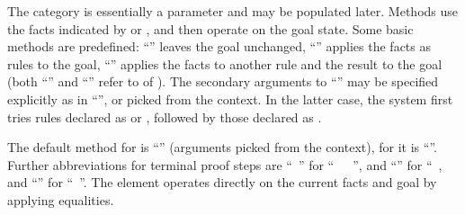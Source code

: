 \begin{isabellebody}
\begin{isamarkuptext}
  The  category is essentially a parameter and may be
  populated later.  Methods use the facts indicated by \hyperlink{command.then}{\mbox{}} or \hyperlink{command.using}{\mbox{}}, and then operate on the goal state.
  Some basic methods are predefined: ``\hyperlink{method.-}{\mbox{\isa{{\isacharminus}}}}'' leaves the goal
  unchanged, ``\hyperlink{method.this}{\mbox{}}'' applies the facts as rules to the
  goal, ``\hyperlink{method.rule}{\mbox{}}'' applies the facts to another rule and the
  result to the goal (both ``\hyperlink{method.this}{\mbox{}}'' and ``\hyperlink{method.rule}{\mbox{}}''
  refer to \hyperlink{inference.resolution}{\mbox{}} of
  ).  The secondary arguments to
  ``\hyperlink{method.rule}{\mbox{}}'' may be specified explicitly as in ``'', or picked from the context.  In the latter case, the system
  first tries rules declared as \hyperlink{attribute.Pure.elim}{\mbox{}} or
  \hyperlink{attribute.Pure.dest}{\mbox{}}, followed by those declared as \hyperlink{attribute.Pure.intro}{\mbox{}}.

  The default method for \hyperlink{command.proof}{\mbox{}} is ``\hyperlink{method.rule}{\mbox{}}''
  (arguments picked from the context), for \hyperlink{command.qed}{\mbox{}} it is
  ``\hyperlink{method.-}{\mbox{\isa{{\isacharminus}}}}''.  Further abbreviations for terminal proof steps
  are ``\hyperlink{command.by}{\mbox{}}~'' for
  ``\hyperlink{command.proof}{\mbox{}}~~\hyperlink{command.qed}{\mbox{}}~'', and ``\hyperlink{command.ddot}{\mbox{\isa{\isacommand{{\isachardot}{\isachardot}}}}}'' for ``\hyperlink{command.by}{\mbox{}}~\hyperlink{method.rule}{\mbox{}}, and ``\hyperlink{command.dot}{\mbox{\isa{\isacommand{{\isachardot}}}}}'' for ``\hyperlink{command.by}{\mbox{}}~\hyperlink{method.this}{\mbox{}}''.  The \hyperlink{command.unfolding}{\mbox{}} element operates
  directly on the current facts and goal by applying equalities.


\end{isamarkuptext}
\end{isabellebody}
